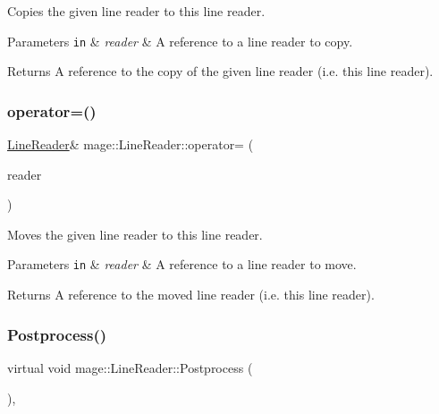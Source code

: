 Copies the given line reader to this line reader.


\begin{DoxyParams}[1]{Parameters}
\mbox{\tt in}  & {\em reader} & A reference to a line reader to copy. \\
\hline
\end{DoxyParams}
\begin{DoxyReturn}{Returns}
A reference to the copy of the given line reader (i.\+e. this line reader). 
\end{DoxyReturn}
\hypertarget{classmage_1_1_line_reader_a45504c0ba4238eedf851cfb9df081a01}{}\label{classmage_1_1_line_reader_a45504c0ba4238eedf851cfb9df081a01} 
\subsubsection{\texorpdfstring{operator=()}{operator=()}\hspace{0.1cm}{\footnotesize\ttfamily [2/2]}}
{\footnotesize\ttfamily \hyperlink{classmage_1_1_line_reader}{Line\+Reader}\& mage\+::\+Line\+Reader\+::operator= (\begin{DoxyParamCaption}\item[{\hyperlink{classmage_1_1_line_reader}{Line\+Reader} \&\&}]{reader }\end{DoxyParamCaption})\hspace{0.3cm}{\ttfamily [delete]}}

Moves the given line reader to this line reader.


\begin{DoxyParams}[1]{Parameters}
\mbox{\tt in}  & {\em reader} & A reference to a line reader to move. \\
\hline
\end{DoxyParams}
\begin{DoxyReturn}{Returns}
A reference to the moved line reader (i.\+e. this line reader). 
\end{DoxyReturn}
\hypertarget{classmage_1_1_line_reader_adfde21013140a1058d3dd567204abfb5}{}\label{classmage_1_1_line_reader_adfde21013140a1058d3dd567204abfb5} 
\subsubsection{\texorpdfstring{Postprocess()}{Postprocess()}}
{\footnotesize\ttfamily virtual void mage\+::\+Line\+Reader\+::\+Postprocess (\begin{DoxyParamCaption}{ }\end{DoxyParamCaption})\hspace{0.3cm}{\ttfamily [private]}, {\ttfamily [virtual]}}


